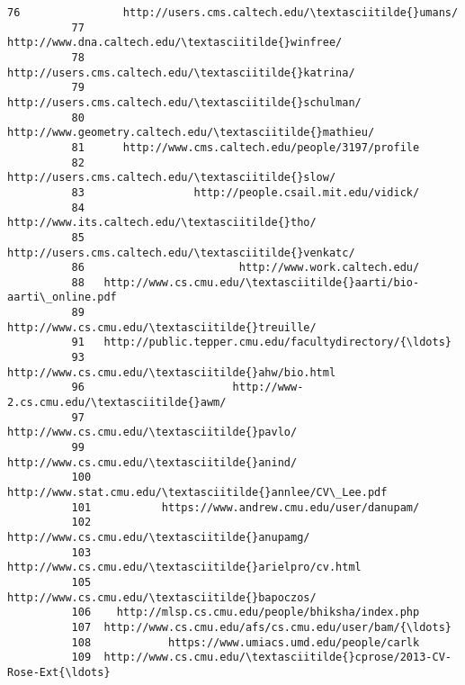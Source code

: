 \documentclass[11pt]{article}
\begin{document}
\begin{Verbatim}[commandchars=\\\{\}]
          76                http://users.cms.caltech.edu/\textasciitilde{}umans/   
          77                http://www.dna.caltech.edu/\textasciitilde{}winfree/   
          78              http://users.cms.caltech.edu/\textasciitilde{}katrina/   
          79             http://users.cms.caltech.edu/\textasciitilde{}schulman/   
          80           http://www.geometry.caltech.edu/\textasciitilde{}mathieu/   
          81      http://www.cms.caltech.edu/people/3197/profile   
          82                 http://users.cms.caltech.edu/\textasciitilde{}slow/   
          83                 http://people.csail.mit.edu/vidick/   
          84                    http://www.its.caltech.edu/\textasciitilde{}tho/   
          85              http://users.cms.caltech.edu/\textasciitilde{}venkatc/   
          86                        http://www.work.caltech.edu/   
          88   http://www.cs.cmu.edu/\textasciitilde{}aarti/bio-aarti\_online.pdf   
          89                    http://www.cs.cmu.edu/\textasciitilde{}treuille/   
          91   http://public.tepper.cmu.edu/facultydirectory/{\ldots}   
          93                 http://www.cs.cmu.edu/\textasciitilde{}ahw/bio.html   
          96                       http://www-2.cs.cmu.edu/\textasciitilde{}awm/   
          97                       http://www.cs.cmu.edu/\textasciitilde{}pavlo/   
          99                       http://www.cs.cmu.edu/\textasciitilde{}anind/   
          100         http://www.stat.cmu.edu/\textasciitilde{}annlee/CV\_Lee.pdf   
          101           https://www.andrew.cmu.edu/user/danupam/   
          102                    http://www.cs.cmu.edu/\textasciitilde{}anupamg/   
          103            http://www.cs.cmu.edu/\textasciitilde{}arielpro/cv.html   
          105                   http://www.cs.cmu.edu/\textasciitilde{}bapoczos/   
          106    http://mlsp.cs.cmu.edu/people/bhiksha/index.php   
          107  http://www.cs.cmu.edu/afs/cs.cmu.edu/user/bam/{\ldots}   
          108            https://www.umiacs.umd.edu/people/carlk   
          109  http://www.cs.cmu.edu/\textasciitilde{}cprose/2013-CV-Rose-Ext{\ldots}   
          

\end{Verbatim}
\end{document}
